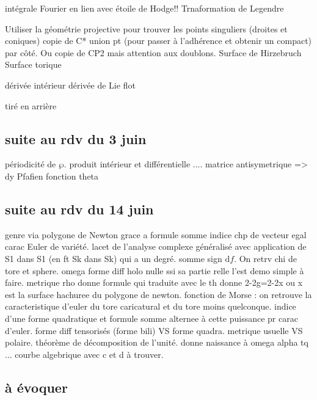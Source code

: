 \documentclass{article}
\theoremstyle{definition} %
\newcommand{\dd}{ \mathrm{d}}
\newcommand{\1}{\mathbb{1}} %
\begin{document}
intégrale Fourier en lien avec étoile de Hodge!!
Trnaformation de Legendre

Utiliser la géométrie projective pour trouver les points singuliers (droites et coniques)
copie de C* union pt (pour passer à l'adhérence et obtenir un compact) par côté.
Ou copie de CP2 mais attention aux doublons.
Surface de Hirzebruch
Surface torique

dérivée intérieur
dérivée de Lie
flot

tiré en arrière

\subsection{suite au rdv du 3 juin}

périodicité de $\wp$.
produit intérieur et différentielle ....
matrice antisymetrique => dy
Pfafien
fonction theta

\subsection{suite au rdv du 14 juin}
genre via polygone de Newton grace a formule somme indice chp de vecteur egal carac Euler de variété.
lacet de l'analyse complexe généralisé avec application de S1 dans S1 (en ft Sk dans Sk) qui a un degré. somme sign $\dd f$.
On retrv chi de tore et sphere.
omega forme diff holo nulle ssi sa partie relle l'est demo simple à faire.
metrique rho donne formule qui traduite avec le th donne 2-2g=2-2x ou x est la surface hachuree du polygone de newton.
fonction de Morse : on retrouve la caracteristique d'euler du tore caricatural et du tore moins quelconque.
indice d'une forme quadratique et formule somme alternee à cette puissance pr carac d'euler.
forme diff tensorisés (forme bili) VS forme quadra.
metrique usuelle VS polaire.
théorème de décomposition de l'unité.
donne naissance à omega alpha tq ... courbe algebrique avec c et d à trouver.


\subsection{à évoquer}
\end{document}
